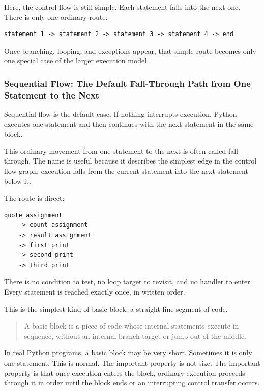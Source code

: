 Here, the control flow is still simple. Each statement falls into the next one. There is only one ordinary route:

\begin{verbatim}
statement 1 -> statement 2 -> statement 3 -> statement 4 -> end
\end{verbatim}

Once branching, looping, and exceptions appear, that simple route becomes only one special case of the larger execution model.

\subsubsection{Sequential Flow: The Default Fall-Through Path from One Statement to the Next}

Sequential flow is the default case. If nothing interrupts execution, Python executes one statement and then continues with the next statement in the same block.

This ordinary movement from one statement to the next is often called fall-through. The name is useful because it describes the simplest edge in the control flow graph: execution falls from the current statement into the next statement below it.

The route is direct:

\begin{verbatim}
quote assignment
    -> count assignment
    -> result assignment
    -> first print
    -> second print
    -> third print
\end{verbatim}

There is no condition to test, no loop target to revisit, and no handler to enter. Every statement is reached exactly once, in written order.

This is the simplest kind of basic block: a straight-line segment of code.

\begin{quote}
A basic block is a piece of code whose internal statements execute in sequence, without an internal branch target or jump out of the middle.
\end{quote}

In real Python programs, a basic block may be very short. Sometimes it is only one statement. This is normal. The important property is not size. The important property is that once execution enters the block, ordinary execution proceeds through it in order until the block ends or an interrupting control transfer occurs.

